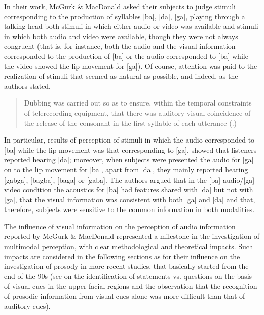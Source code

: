\documentclass[output=paper]{langsci/langscibook}
\begin{document}
In their \citeyear{McGurk1976} work, McGurk \& MacDonald asked their subjects to judge stimuli corresponding to the production of syllables [ba], [da], [ga], playing through a talking head both stimuli in which either audio or video was available and stimuli in which both audio and video were available, though they were not always congruent (that is, for instance, both the audio and the visual information corresponded to the production of [ba] or the audio corresponded to [ba] while the video showed the lip movement for [ga]). Of course, attention was paid to the realization of stimuli that seemed as natural as possible, and indeed, as the authors stated, 

\begin{quote}
Dubbing was carried out so as to ensure, within the temporal constraints of telerecording equipment, that there was auditory-visual coincidence of the release of the consonant in the first syllable of each utterance (\citealt[746]{McGurk1976}.)
\end{quote}

In particular, results of perception of stimuli in which the audio corresponded to [ba] while the lip movement was that corresponding to [ga], showed that listeners reported hearing [da]; moreover, when subjects were presented the audio for [ga] on to the lip movement for [ba], apart from [da], they mainly reported hearing [gabga], [bagba], [baga] or [gaba]. The authors argued that in the [ba]-audio\slash [ga]-video condition the acoustics for [ba] had features shared with [da] but not with [ga], that the visual information was consistent with both [ga] and [da] and that, therefore, subjects were sensitive to the common information in both modalities. 

The influence of visual information on the perception of audio information reported by McGurk \& MacDonald represented a milestone in the investigation of multimodal perception, with clear methodological and theoretical impacts. Such impacts are considered in the following sections as for their influence on the investigation of prosody in more recent studies, that basically started from the end of the 90s (see \citealt{Lansing1999} on the identification of statements vs. questions on the basis of visual cues in the upper facial regions and the observation that the recognition of prosodic information from visual cues alone was more difficult than that of auditory cues).
\end{document}
